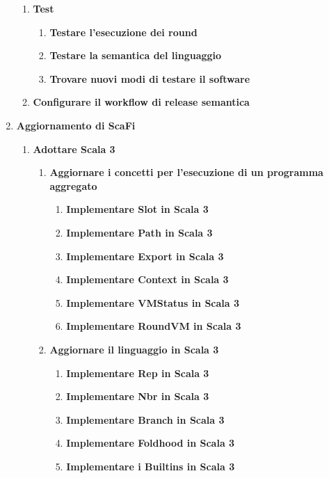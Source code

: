 \documentclass[12pt, a4paper]{article}
\begin{document}
\begin{enumerate}
\begin{enumerate}
              \item \textbf{Test}
                    \begin{enumerate}
                        \item \textbf{Testare l'esecuzione dei round}
                        \item \textbf{Testare la semantica del linguaggio}
                        \item \textbf{Trovare nuovi modi di testare il software}
                    \end{enumerate}
              \item \textbf{Configurare il workflow di release semantica}

          \end{enumerate}

          \color{cyan}
    \item \textbf{Aggiornamento di ScaFi}
          \begin{enumerate}
              \item \textbf{Adottare Scala 3}
                    \begin{enumerate}
                        \item \textbf{Aggiornare i concetti per l'esecuzione di un programma aggregato}
                              \begin{enumerate}
                                  \item \textbf{Implementare Slot in Scala 3}
                                  \item \textbf{Implementare Path in Scala 3}
                                  \item \textbf{Implementare Export in Scala 3}
                                  \item \textbf{Implementare Context in Scala 3}
                                  \item \textbf{Implementare VMStatus in Scala 3}
                                  \item \textbf{Implementare RoundVM in Scala 3}
                              \end{enumerate}

                        \item \textbf{Aggiornare il linguaggio in Scala 3}
                              \begin{enumerate}
                                  \item \textbf{Implementare Rep in Scala 3}
                                  \item \textbf{Implementare Nbr in Scala 3}
                                  \item \textbf{Implementare Branch in Scala 3}
                                  \item \textbf{Implementare Foldhood in Scala 3}
                                  \item \textbf{Implementare i Builtins in Scala 3}
                              \end{enumerate}


\end{enumerate}
\end{enumerate}
\end{enumerate}
\end{document}
